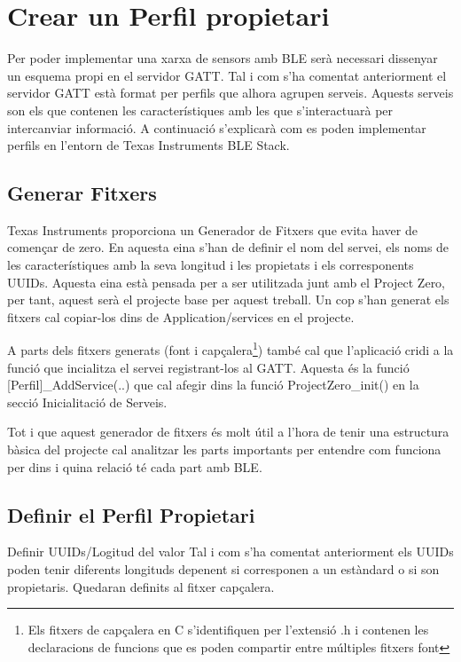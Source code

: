 \section{Crear un Perfil propietari}

Per poder implementar una xarxa de sensors amb BLE serà necessari dissenyar un esquema propi en el servidor GATT.
Tal i com s'ha comentat anteriorment el servidor GATT està format per perfils que alhora agrupen serveis.
Aquests serveis son els que contenen les característiques amb les que s'interactuarà per intercanviar informació.
A continuació s'explicarà com es poden implementar perfils en l'entorn de Texas Instruments BLE Stack.

\subsection{Generar Fitxers}
Texas Instruments proporciona un Generador de Fitxers \cite{Service_Generator} que evita haver de començar de zero.
En aquesta eina s'han de definir el nom del servei, els noms de les característiques amb la seva longitud i les propietats i els corresponents UUIDs.
Aquesta eina està pensada per a ser utilitzada junt amb el Project Zero, per tant, aquest serà el projecte base per aquest treball.
Un cop s'han generat els fitxers cal copiar-los dins de Application/services en el projecte.

A parts dels fitxers generats (font i capçalera\footnote{Els fitxers de capçalera en C s'identifiquen per l'extensió .h i contenen les declaracions de funcions que es poden compartir entre múltiples fitxers font}) també cal que l'aplicació cridi a la funció que incialitza el servei registrant-los al GATT.
Aquesta és la funció [Perfil]\_AddService(..) que cal afegir dins la funció ProjectZero\_init() en la secció Inicialitació de Serveis.

Tot i que aquest generador de fitxers és molt útil a l'hora de tenir una estructura bàsica del projecte cal analitzar les parts importants per entendre com funciona per dins i quina relació té cada part amb BLE.

\subsection{Definir el Perfil Propietari}

Definir UUIDs/Logitud del valor
Tal i com s'ha comentat anteriorment els UUIDs poden tenir diferents longituds depenent si corresponen a un estàndard o si son propietaris.
Quedaran definits al fitxer capçalera.

